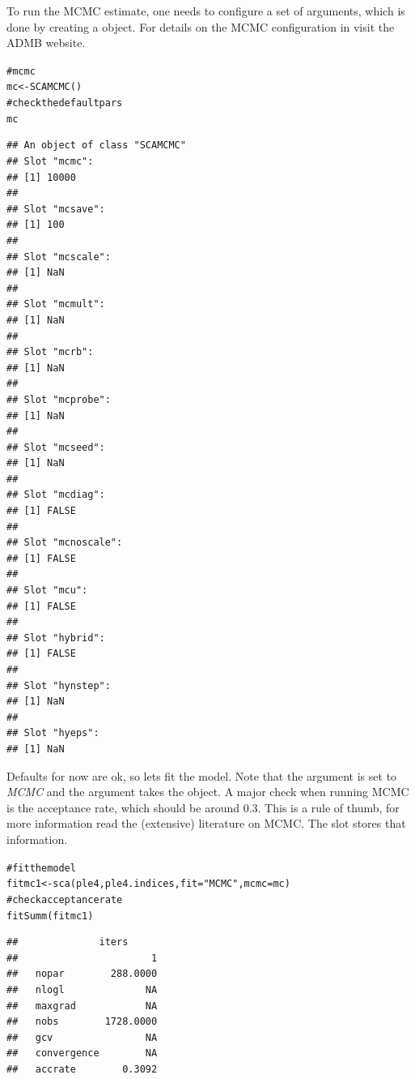 \documentclass[a4paper,english,10pt]{article}\usepackage[]{graphicx}\usepackage[]{color}
\makeatletter
\newcommand{\hlstr}[1]{\textcolor[rgb]{0.063,0.58,0.627}{#1}}%
\newcommand{\hlcom}[1]{\textcolor[rgb]{0.588,0.588,0.588}{#1}}%
\newcommand{\hlstd}[1]{\textcolor[rgb]{0.196,0.196,0.196}{#1}}%
\newcommand{\hlkwb}[1]{\textcolor[rgb]{0.627,0,0.314}{#1}}%
\newcommand{\hlkwc}[1]{\textcolor[rgb]{0,0.631,0.314}{#1}}%
\newcommand{\hlkwd}[1]{\textcolor[rgb]{0.78,0.227,0.412}{#1}}%
\newenvironment{kframe}{%
 \def\at@end@of@kframe{}%
 \ifinner\ifhmode%
  \def\at@end@of@kframe{\end{minipage}}%
  \begin{minipage}{\columnwidth}%
 \fi\fi%
 \def\FrameCommand##1{\hskip\@totalleftmargin \hskip-\fboxsep
 \colorbox{shadecolor}{##1}\hskip-\fboxsep
     \hskip-\linewidth \hskip-\@totalleftmargin \hskip\columnwidth}%
 \MakeFramed {\advance\hsize-\width
   \@totalleftmargin\z@ \linewidth\hsize
   \@setminipage}}%
 {\par\unskip\endMakeFramed%
 \at@end@of@kframe}
\newenvironment{knitrout}{}{} %
\makeatother
\begin{document}
To run the MCMC estimate, one needs to configure a set of arguments, which is done by creating a  object. For details on the MCMC configuration in  visit the ADMB website.

\begin{knitrout}
\color{fgcolor}\begin{kframe}
\begin{alltt}
\hlcom{# mcmc}
\hlstd{mc} \hlkwb{<-} \hlkwd{SCAMCMC}\hlstd{()}
\hlcom{# check the default pars}
\hlstd{mc}
\end{alltt}
\begin{verbatim}
## An object of class "SCAMCMC"
## Slot "mcmc":
## [1] 10000
## 
## Slot "mcsave":
## [1] 100
## 
## Slot "mcscale":
## [1] NaN
## 
## Slot "mcmult":
## [1] NaN
## 
## Slot "mcrb":
## [1] NaN
## 
## Slot "mcprobe":
## [1] NaN
## 
## Slot "mcseed":
## [1] NaN
## 
## Slot "mcdiag":
## [1] FALSE
## 
## Slot "mcnoscale":
## [1] FALSE
## 
## Slot "mcu":
## [1] FALSE
## 
## Slot "hybrid":
## [1] FALSE
## 
## Slot "hynstep":
## [1] NaN
## 
## Slot "hyeps":
## [1] NaN
\end{verbatim}
\end{kframe}
\end{knitrout}

Defaults for now are ok, so lets fit the model. Note that the argument  is set to \emph{MCMC} and the argument  takes the  object. A major check when running MCMC is the acceptance rate, which should be around 0.3. This is a rule of thumb, for more information read the (extensive) literature on MCMC. The slot  stores that information.

\begin{knitrout}
\color{fgcolor}\begin{kframe}
\begin{alltt}
\hlcom{# fit the model}
\hlstd{fitmc1} \hlkwb{<-} \hlkwd{sca}\hlstd{(ple4, ple4.indices,} \hlkwc{fit} \hlstd{=} \hlstr{"MCMC"}\hlstd{,} \hlkwc{mcmc} \hlstd{= mc)}
\hlcom{# check acceptance rate}
\hlkwd{fitSumm}\hlstd{(fitmc1)}
\end{alltt}
\begin{verbatim}
##              iters
##                       1
##   nopar        288.0000
##   nlogl              NA
##   maxgrad            NA
##   nobs        1728.0000
##   gcv                NA
##   convergence        NA
##   accrate        0.3092
\end{verbatim}
\end{kframe}
\end{knitrout}
\end{document}
